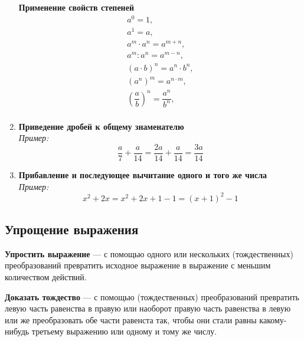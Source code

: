 \documentclass[12pt, a4paper]{article}
\begin{document}
\begin{enumerate}
			\textbf{Применение свойств степеней}
			$$\begin{array}{c}
				a^0  =  1,\\
				a^1  =  a,\\
				a^m \cdot a^n  =  a^{m+n},\\
				a^m : a^n  =  a^{m-n},\\
				(a \cdot b)^n  =  a^n \cdot b^n,\\
				(a^n)^m  =  a^{n \cdot m},\\
				(\dfrac{a}{b})^n  =  \dfrac{a^n}{b^n},\\
			\end{array}$$
		\item
			\textbf{Приведение дробей к общему знаменателю}\\
			\textit{Пример:}
			$$\dfrac{a}{7}+\dfrac{a}{14}=\dfrac{2a}{14}+\dfrac{a}{14}=\dfrac{3a}{14}$$
		\item
			\textbf{Прибавление и последующее вычитание одного и того же числа}\\
			\textit{Пример:}
			$$x^2+2x=x^2+2x+1-1=(x+1)^2-1$$
	\end{enumerate}

	\subsection*{Упрощение выражения}
	
	\textbf{Упростить выражение} — с помощью одного или нескольких (тождественных) преобразований превратить исходное выражение в выражение с меньшим количеством действий.
	
	\textbf{Доказать тождество} — с помощью (тождественных) преобразований превратить левую часть равенства в правую или наоборот правую часть равенства в левую или же преобразовать обе части равенста так, чтобы они стали равны какому-нибудь третьему выражению или одному и тому же числу.
\end{document}
